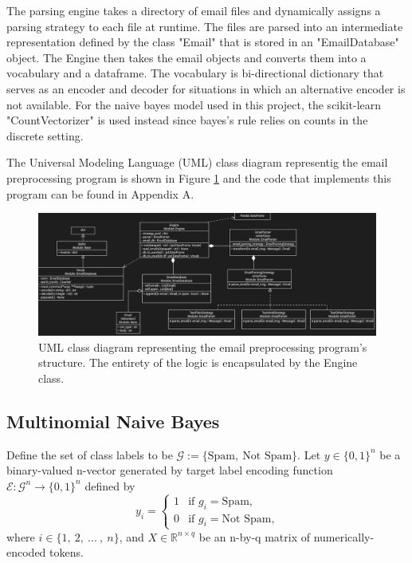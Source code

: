 \documentclass[10pt,a4paper]{article}
\begin{document}
The parsing engine takes a directory of email files and dynamically assigns a parsing strategy to each file at runtime. The files are parsed into an intermediate representation defined by the class "Email" that is stored in an "EmailDatabase" object. The Engine then takes the email objects and converts them into a vocabulary and a dataframe. The vocabulary is bi-directional dictionary that serves as an encoder and decoder for situations in which an alternative encoder is not available. For the naive bayes model used in this project, the scikit-learn "CountVectorizer" is used instead since bayes's rule relies on counts in the discrete setting.

The Universal Modeling Language (UML) class diagram representig the email preprocessing program is shown in Figure \ref{emailUML} and the code that implements this program can be found in Appendix A.


\begin{figure}
\includegraphics{umlclassdiagscaled.png}
\caption{UML class diagram representing the email preprocessing program's structure. The entirety of the logic is encapsulated by the Engine class.}
\label{emailUML}
\end{figure}

\subsection{Multinomial Naive Bayes}

Define the set of class labels to be $\mathcal{G} := \{\text{Spam}, \ \text{Not Spam}\}$.
Let $y \in \{0,1\}^{n}$ be a binary-valued n-vector generated by target label encoding function $\mathcal{E}: \mathcal{G}^{n} \longrightarrow \{0,1\}^{n}$ defined by
\[
y_{i} = 
	\begin{cases}
	1 & \text{if $g_{i} = \text{Spam}$,} \\
	0 & \text{if $g_{i} = \text{Not Spam}$,}
	\end{cases}
\]
where $i \in \{1, \ 2, \ ... \ , \ n\}$, and $X \in \mathbb{R}^{n \times q}$ be an n-by-q matrix of numerically-encoded tokens.
\end{document}
